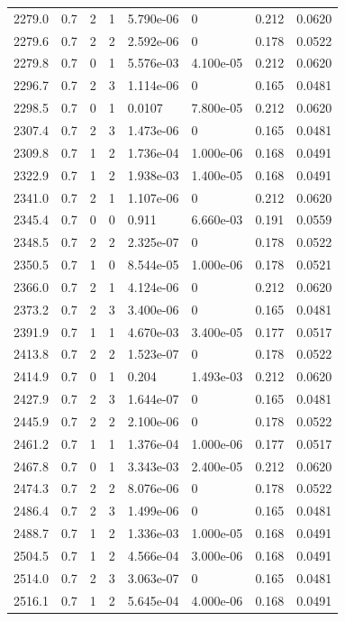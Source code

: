 \documentclass[preview]{standalone}
\begin{document}
{{{{{\begin{tabular}{L{1.2cm}C{1.2cm} C{0.3cm}C{0.5cm} C{1.4cm}C{1.4cm} C{1.4cm}C{1.4cm}}
  2279.0  &   0.7  & 2     &  1 &  5.790e-06  & 0  & 0.212 &  0.0620   \\ 
  2279.6  &   0.7  & 2     &  2 &  2.592e-06  & 0  & 0.178 &  0.0522   \\ 
  2279.8  &   0.7  & 0     &  1 &  5.576e-03  & 4.100e-05  & 0.212 &  0.0620   \\ 
  2296.7  &   0.7  & 2     &  3 &  1.114e-06  & 0  & 0.165 &  0.0481   \\ 
  2298.5  &   0.7  & 0     &  1 &  0.0107  & 7.800e-05  & 0.212 &  0.0620   \\ 
  2307.4  &   0.7  & 2     &  3 &  1.473e-06  & 0  & 0.165 &  0.0481   \\ 
  2309.8  &   0.7  & 1     &  2 &  1.736e-04  & 1.000e-06  & 0.168 &  0.0491   \\ 
  2322.9  &   0.7  & 1     &  2 &  1.938e-03  & 1.400e-05  & 0.168 &  0.0491   \\ 
  2341.0  &   0.7  & 2     &  1 &  1.107e-06  & 0  & 0.212 &  0.0620   \\ 
  2345.4  &   0.7  & 0     &  0 &  0.911  & 6.660e-03  & 0.191 &  0.0559   \\ 
  2348.5  &   0.7  & 2     &  2 &  2.325e-07  & 0  & 0.178 &  0.0522   \\ 
  2350.5  &   0.7  & 1     &  0 &  8.544e-05  & 1.000e-06  & 0.178 &  0.0521   \\ 
  2366.0  &   0.7  & 2     &  1 &  4.124e-06  & 0  & 0.212 &  0.0620   \\ 
  2373.2  &   0.7  & 2     &  3 &  3.400e-06  & 0  & 0.165 &  0.0481   \\ 
  2391.9  &   0.7  & 1     &  1 &  4.670e-03  & 3.400e-05  & 0.177 &  0.0517   \\ 
  2413.8  &   0.7  & 2     &  2 &  1.523e-07  & 0  & 0.178 &  0.0522   \\ 
  2414.9  &   0.7  & 0     &  1 &  0.204  & 1.493e-03  & 0.212 &  0.0620   \\ 
  2427.9  &   0.7  & 2     &  3 &  1.644e-07  & 0  & 0.165 &  0.0481   \\ 
  2445.9  &   0.7  & 2     &  2 &  2.100e-06  & 0  & 0.178 &  0.0522   \\ 
  2461.2  &   0.7  & 1     &  1 &  1.376e-04  & 1.000e-06  & 0.177 &  0.0517   \\ 
  2467.8  &   0.7  & 0     &  1 &  3.343e-03  & 2.400e-05  & 0.212 &  0.0620   \\ 
  2474.3  &   0.7  & 2     &  2 &  8.076e-06  & 0  & 0.178 &  0.0522   \\ 
  2486.4  &   0.7  & 2     &  3 &  1.499e-06  & 0  & 0.165 &  0.0481   \\ 
  2488.7  &   0.7  & 1     &  2 &  1.336e-03  & 1.000e-05  & 0.168 &  0.0491   \\ 
  2504.5  &   0.7  & 1     &  2 &  4.566e-04  & 3.000e-06  & 0.168 &  0.0491   \\ 
  2514.0  &   0.7  & 2     &  3 &  3.063e-07  & 0  & 0.165 &  0.0481   \\ 
  2516.1  &   0.7  & 1     &  2 &  5.645e-04  & 4.000e-06  & 0.168 &  0.0491   \\ 
\hline 
\end{tabular} 

}}}}}
\end{document}
